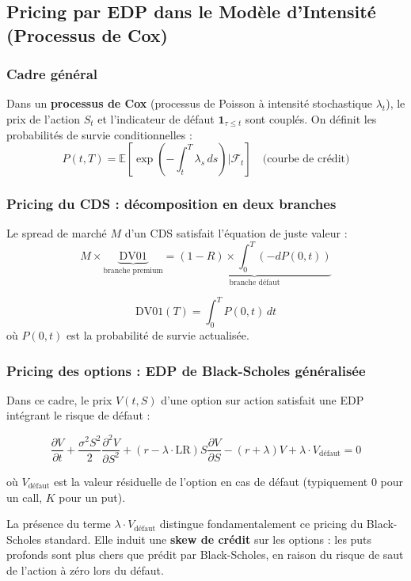 \subsection{Pricing par EDP dans le Modèle d'Intensité (Processus de Cox)}

\subsubsection{Cadre général}

Dans un \textbf{processus de Cox} (processus de Poisson à intensité stochastique $\lambda_t$), le prix de l'action $S_t$ et l'indicateur de défaut $\mathbf{1}_{\tau \leq t}$ sont couplés. On définit les probabilités de survie conditionnelles :
\[
P(t, T) = \mathbb{E}\!\left[\exp\!\left(-\int_t^T \lambda_s \, ds\right) \Bigg| \mathcal{F}_t\right] \quad \text{(courbe de crédit)}
\]

\subsubsection{Pricing du CDS : décomposition en deux branches}

Le spread de marché $M$ d'un CDS satisfait l'équation de juste valeur :
\[
M \times \underbrace{\mathrm{DV01}}_{\text{branche premium}} = \underbrace{(1-R) \times \int_0^T (-dP(0,t))}_{\text{branche défaut}}
\]

\begin{definition}
\[
\mathrm{DV01}(T) = \int_0^T P(0, t) \, dt
\]
où $P(0, t)$ est la probabilité de survie actualisée.
\end{definition}

\subsubsection{Pricing des options : EDP de Black-Scholes généralisée}

Dans ce cadre, le prix $V(t, S)$ d'une option sur action satisfait une EDP intégrant le risque de défaut :

\[
\frac{\partial V}{\partial t} + \frac{\sigma^2 S^2}{2} \frac{\partial^2 V}{\partial S^2} + (r - \lambda \cdot \mathrm{LR}) S \frac{\partial V}{\partial S} - (r + \lambda) V + \lambda \cdot V_{\mathrm{défaut}} = 0
\]

où $V_{\mathrm{défaut}}$ est la valeur résiduelle de l'option en cas de défaut (typiquement 0 pour un call, $K$ pour un put).

\begin{remarque}
La présence du terme $\lambda \cdot V_{\mathrm{défaut}}$ distingue fondamentalement ce pricing du Black-Scholes standard. Elle induit une \textbf{skew de crédit} sur les options : les puts profonds sont plus chers que prédit par Black-Scholes, en raison du risque de saut de l'action à zéro lors du défaut.
\end{remarque}
